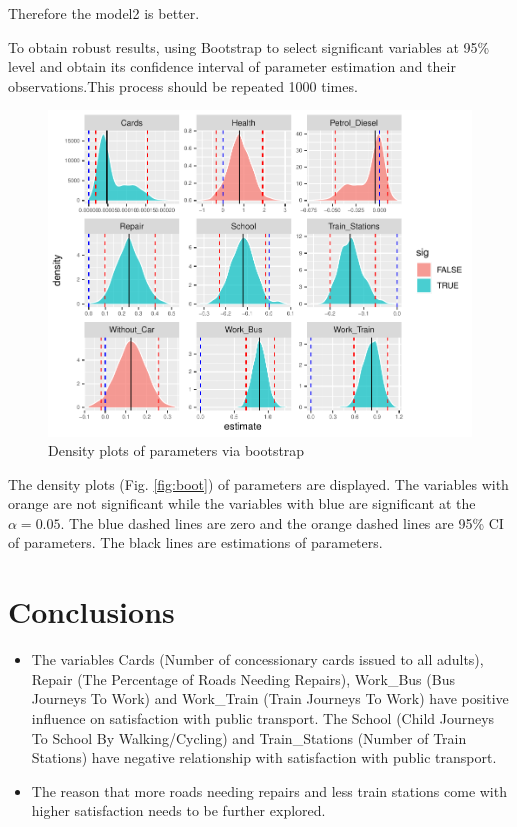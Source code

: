 \documentclass[
]{article}
\begin{document}
Therefore the model2 is better.

To obtain robust results, using Bootstrap to select significant
variables at 95\% level and obtain its confidence interval of parameter
estimation and their observations.This process should be repeated 1000
times.

\begin{figure}[H]

{\centering \includegraphics[width=0.8\linewidth]{RMD-Group-28_files/figure-latex/unnamed-chunk-11-1} 

}

\caption{Density plots of parameters via bootstrap\label{fig:boot}}\label{fig:unnamed-chunk-11}
\end{figure}

The density plots (Fig. \ref{fig:boot}) of parameters are displayed. The
variables with orange are not significant while the variables with blue
are significant at the \(\alpha=0.05\). The blue dashed lines are zero
and the orange dashed lines are 95\% CI of parameters. The black lines
are estimations of parameters.

\hypertarget{sec:Conc}{%
\section{Conclusions}\label{sec:Conc}}

\begin{itemize}
\item
  The variables Cards (Number of concessionary cards issued to all
  adults), Repair (The Percentage of Roads Needing Repairs), Work\_Bus
  (Bus Journeys To Work) and Work\_Train (Train Journeys To Work) have
  positive influence on satisfaction with public transport. The School
  (Child Journeys To School By Walking/Cycling) and Train\_Stations
  (Number of Train Stations) have negative relationship with
  satisfaction with public transport.
\item
  The reason that more roads needing repairs and less train stations
  come with higher satisfaction needs to be further explored.
\end{itemize}
\end{document}
